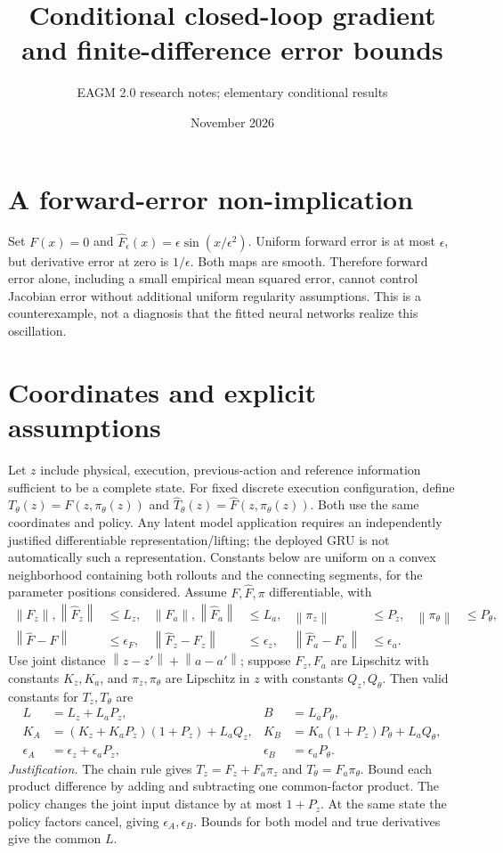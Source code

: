 \documentclass{article}
\title{Conditional closed-loop gradient and finite-difference error bounds}
\author{EAGM 2.0 research notes; elementary conditional results}
\date{November 2026}
\newcommand{\norm}[1]{\left\|#1\right\|}
\begin{document}
\maketitle
\section{A forward-error non-implication}
Set $F(x)=0$ and $\widehat F_\epsilon(x)=\epsilon\sin(x/\epsilon^2)$. Uniform forward error is at most $\epsilon$, but derivative error at zero is $1/\epsilon$. Both maps are smooth. Therefore forward error alone, including a small empirical mean squared error, cannot control Jacobian error without additional uniform regularity assumptions. This is a counterexample, not a diagnosis that the fitted neural networks realize this oscillation.

\section{Coordinates and explicit assumptions}
Let $z$ include physical, execution, previous-action and reference information sufficient to be a complete state. For fixed discrete execution configuration, define
$T_\theta(z)=F(z,\pi_\theta(z))$ and $\widehat T_\theta(z)=\widehat F(z,\pi_\theta(z))$.
Both use the same coordinates and policy. Any latent model application requires an independently justified differentiable representation/lifting; the deployed GRU is not automatically such a representation. Constants below are uniform on a convex neighborhood containing both rollouts and the connecting segments, for the parameter positions considered. Assume $F,\widehat F,\pi$ differentiable, with
\begin{align*}
\norm{F_z},\norm{\widehat F_z}&\le L_z,&
\norm{F_a},\norm{\widehat F_a}&\le L_a,&
\norm{\pi_z}&\le P_z,&\norm{\pi_\theta}&\le P_\theta,\\
\norm{\widehat F-F}&\le\epsilon_F,&
\norm{\widehat F_z-F_z}&\le\epsilon_z,&
\norm{\widehat F_a-F_a}&\le\epsilon_a.
\end{align*}
Use joint distance $\norm{z-z'}+\norm{a-a'}$; suppose $F_z,F_a$ are Lipschitz with constants $K_z,K_a$, and $\pi_z,\pi_\theta$ are Lipschitz in $z$ with constants $Q_z,Q_\theta$. Then valid constants for $T_z,T_\theta$ are
\begin{align*}
L&=L_z+L_aP_z,& B&=L_aP_\theta,\\
K_A&=(K_z+K_aP_z)(1+P_z)+L_aQ_z,&
K_B&=K_a(1+P_z)P_\theta+L_aQ_\theta,\\
\epsilon_A&=\epsilon_z+\epsilon_aP_z,&
\epsilon_B&=\epsilon_aP_\theta.
\end{align*}
\textit{Justification.} The chain rule gives $T_z=F_z+F_a\pi_z$ and $T_\theta=F_a\pi_\theta$. Bound each product difference by adding and subtracting one common-factor product. The policy changes the joint input distance by at most $1+P_z$. At the same state the policy factors cancel, giving $\epsilon_A,\epsilon_B$. Bounds for both model and true derivatives give the common $L$.
\end{document}
